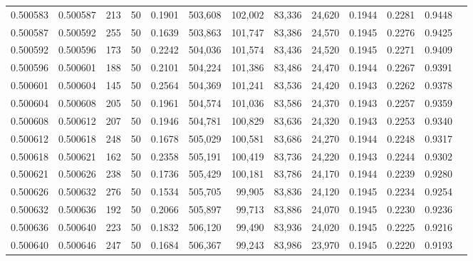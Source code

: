 \begin{tabular}{rrrrrrrrrrrrr}
0.500583 & 0.500587 & 213 &  50 &                                     0.1901 & 503,608 & 102,002 &  83,336 &  24,620 & 0.1944 & 0.2281 & 0.9448 \\
0.500587 & 0.500592 & 255 &  50 &                                     0.1639 & 503,863 & 101,747 &  83,386 &  24,570 & 0.1945 & 0.2276 & 0.9425 \\
0.500592 & 0.500596 & 173 &  50 &                                     0.2242 & 504,036 & 101,574 &  83,436 &  24,520 & 0.1945 & 0.2271 & 0.9409 \\
0.500596 & 0.500601 & 188 &  50 &                                     0.2101 & 504,224 & 101,386 &  83,486 &  24,470 & 0.1944 & 0.2267 & 0.9391 \\
0.500601 & 0.500604 & 145 &  50 &                                     0.2564 & 504,369 & 101,241 &  83,536 &  24,420 & 0.1943 & 0.2262 & 0.9378 \\
0.500604 & 0.500608 & 205 &  50 &                                     0.1961 & 504,574 & 101,036 &  83,586 &  24,370 & 0.1943 & 0.2257 & 0.9359 \\
0.500608 & 0.500612 & 207 &  50 &                                     0.1946 & 504,781 & 100,829 &  83,636 &  24,320 & 0.1943 & 0.2253 & 0.9340 \\
0.500612 & 0.500618 & 248 &  50 &                                     0.1678 & 505,029 & 100,581 &  83,686 &  24,270 & 0.1944 & 0.2248 & 0.9317 \\
0.500618 & 0.500621 & 162 &  50 &                                     0.2358 & 505,191 & 100,419 &  83,736 &  24,220 & 0.1943 & 0.2244 & 0.9302 \\
0.500621 & 0.500626 & 238 &  50 &                                     0.1736 & 505,429 & 100,181 &  83,786 &  24,170 & 0.1944 & 0.2239 & 0.9280 \\
0.500626 & 0.500632 & 276 &  50 &                                     0.1534 & 505,705 &  99,905 &  83,836 &  24,120 & 0.1945 & 0.2234 & 0.9254 \\
0.500632 & 0.500636 & 192 &  50 &                                     0.2066 & 505,897 &  99,713 &  83,886 &  24,070 & 0.1945 & 0.2230 & 0.9236 \\
0.500636 & 0.500640 & 223 &  50 &                                     0.1832 & 506,120 &  99,490 &  83,936 &  24,020 & 0.1945 & 0.2225 & 0.9216 \\
0.500640 & 0.500646 & 247 &  50 &                                     0.1684 & 506,367 &  99,243 &  83,986 &  23,970 & 0.1945 & 0.2220 & 0.9193 \\

\end{tabular}
